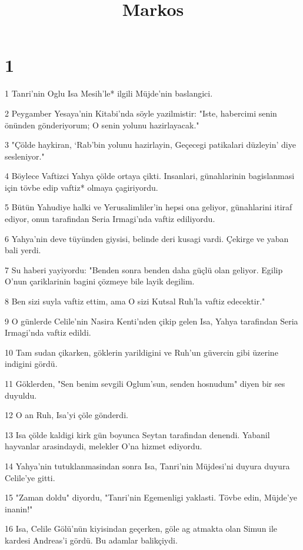 

\title{Markos}


\chapter{1}

\par 1 Tanri'nin Oglu Isa Mesih'le* ilgili Müjde'nin baslangici.
\par 2 Peygamber Yesaya'nin Kitabi'nda söyle yazilmistir: "Iste, habercimi senin önünden gönderiyorum; O senin yolunu hazirlayacak."
\par 3 "Çölde haykiran, `Rab'bin yolunu hazirlayin, Geçecegi patikalari düzleyin' diye sesleniyor."
\par 4 Böylece Vaftizci Yahya çölde ortaya çikti. Insanlari, günahlarinin bagislanmasi için tövbe edip vaftiz* olmaya çagiriyordu.
\par 5 Bütün Yahudiye halki ve Yerusalimliler'in hepsi ona geliyor, günahlarini itiraf ediyor, onun tarafindan Seria Irmagi'nda vaftiz ediliyordu.
\par 6 Yahya'nin deve tüyünden giysisi, belinde deri kusagi vardi. Çekirge ve yaban bali yerdi.
\par 7 Su haberi yayiyordu: "Benden sonra benden daha güçlü olan geliyor. Egilip O'nun çariklarinin bagini çözmeye bile layik degilim.
\par 8 Ben sizi suyla vaftiz ettim, ama O sizi Kutsal Ruh'la vaftiz edecektir."
\par 9 O günlerde Celile'nin Nasira Kenti'nden çikip gelen Isa, Yahya tarafindan Seria Irmagi'nda vaftiz edildi.
\par 10 Tam sudan çikarken, göklerin yarildigini ve Ruh'un güvercin gibi üzerine indigini gördü.
\par 11 Göklerden, "Sen benim sevgili Oglum'sun, senden hosnudum" diyen bir ses duyuldu.
\par 12 O an Ruh, Isa'yi çöle gönderdi.
\par 13 Isa çölde kaldigi kirk gün boyunca Seytan tarafindan denendi. Yabanil hayvanlar arasindaydi, melekler O'na hizmet ediyordu.
\par 14 Yahya'nin tutuklanmasindan sonra Isa, Tanri'nin Müjdesi'ni duyura duyura Celile'ye gitti.
\par 15 "Zaman doldu" diyordu, "Tanri'nin Egemenligi yaklasti. Tövbe edin, Müjde'ye inanin!"
\par 16 Isa, Celile Gölü'nün kiyisindan geçerken, göle ag atmakta olan Simun ile kardesi Andreas'i gördü. Bu adamlar balikçiydi.
